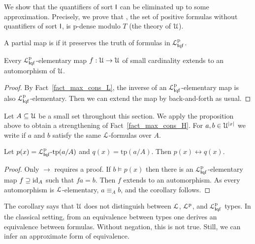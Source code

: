 \documentclass[10pt,oneside]{amsproc}
\renewcommand*{\emph}[1]{%
   \smash{\tikz[baseline]\node[rectangle, fill=teal!25, rounded corners, inner xsep=0.5ex, inner ysep=0.2ex, anchor=base, minimum height = 2.7ex]{\strut #1};}}
\begin{document}
{We show that the quantifiers of sort ${\sf I}$ can be eliminated up to some approximation.
Precisely, we prove that \emph{${\EuScript L}^{\rm p}_{{\sf I}{\rm qf}}$}, the set of positive formulas without quantifiers of sort ${\sf I}$, is p-dense modulo $T$ (the theory of ${\EuScript U}$).

A partial map is \emph{${\EuScript L}^{\rm p}_{{\sf I}{\rm qf}}$-elementary\/} if it preserves the truth of formulas in ${\EuScript L}^{\rm p}_{{\sf I}{\rm qf}}$.

\begin{proposition}
  Every ${\EuScript L}^{\rm p}_{{\sf I}{\rm qf}}$-elementary map $f:{\EuScript U}\to{\EuScript U}$ of small cardinality extends to an automorphism of ${\EuScript U}$.
\end{proposition}

\begin{proof}
  By Fact~\ref{fact_max_cons_L}, the inverse of an ${\EuScript L}^{\rm p}_{{\sf I}{\rm qf}}$-elementary map is also ${\EuScript L}^{\rm p}_{{\sf I}{\rm qf}}$-elementary.
  Then we can extend the map by back-and-forth as usual.
\end{proof}

Let $A\subseteq{\EuScript U}$ be a small set throughout this section.
We apply the proposition above to obtain a strengthening of Fact~\ref{fact_max_cons_H}.
For $a,b\in {\EuScript U}^{|x|}$ we write \emph{$a\equiv_Ab$\/} if $a$ and $b$ satisfy the same ${\EuScript L}$-formulas over $A$.

\begin{corollary}\label{corol_Lcomplete}
  Let $p(x)={\EuScript L}^{\rm p}_{{\sf I}{\rm qf}}\mbox{-tp}(a/A)$ and $q(x)=\mbox{tp}(a/A)$. Then $p(x)\leftrightarrow q(x)$.
\end{corollary}

\begin{proof}
  Only $\rightarrow$ requires a proof.
  If $b\models p(x)$ then there is an ${\EuScript L}^{\rm p}_{{\sf I}{\rm qf}}$-elementary map $f\supseteq{\rm id}_A$ such that $fa=b$.
  Then $f$ extends to an automorphism.
  As every automorphism is ${\EuScript L}$-elementary, $a\equiv_Ab$, and the corollary follows.
\end{proof}

The corollary says that ${\EuScript U}$ does not distinguish between ${\EuScript L}$, ${\EuScript L}^{\rm p}$, and ${\EuScript L}^{\rm p}_{{\sf I}{\rm qf}}$ types.
In the classical setting, from an equivalence between types one derives an equivalence between formulas.
Without negation, this is not true.
Still, we can infer an approximate form of equivalence.

}
\end{document}
